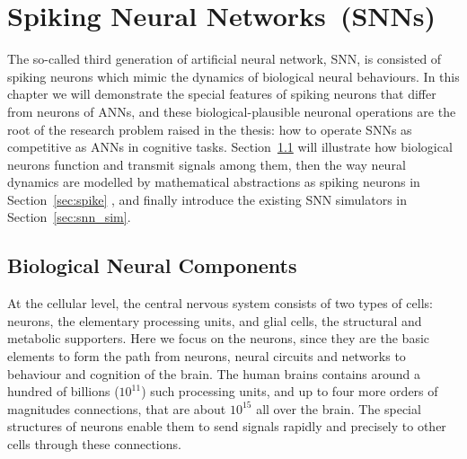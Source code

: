 \chapter{Spiking Neural Networks~(SNNs)}
\label{cha:bkg}
The so-called third generation of artificial neural network, SNN, is consisted of spiking neurons which mimic the dynamics of biological neural behaviours.
In this chapter we will demonstrate the special features of spiking neurons that differ from neurons of ANNs, and these biological-plausible neuronal operations are the root of the research problem raised in the thesis: how to operate SNNs as competitive as ANNs in cognitive tasks.
Section~\ref{sec:bio_neuron} will illustrate how biological neurons function and transmit signals among them, then the way neural dynamics are modelled by mathematical abstractions as spiking neurons in Section~\ref{sec:spike} , and finally introduce the existing SNN simulators in Section~\ref{sec:snn_sim}.

\section{Biological Neural Components}
\label{sec:bio_neuron}
At the cellular level, the central nervous system consists of two types of cells: neurons, the elementary processing units, and glial cells, the structural and metabolic supporters. 
Here we focus on the neurons, since they are the basic elements to form the path from neurons, neural circuits and networks to behaviour and cognition of the brain.
The human brains contains around a hundred of billions ($10^{11}$) such processing units, and up to four more orders of magnitudes connections, that are about $10^{15}$ all over the brain.
The special structures of neurons enable them to send signals rapidly and precisely to other cells through these connections.

